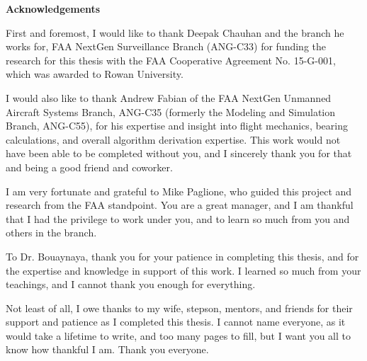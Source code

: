 
\begin{center}
\textbf{Acknowledgements}
\end{center}

First and foremost, I would like to thank Deepak Chauhan and the branch he works for, FAA NextGen Surveillance Branch (ANG-C33) for funding the research for this thesis with the FAA Cooperative Agreement No. 15-G-001, which was awarded to Rowan University.

I would also like to thank Andrew Fabian of the FAA NextGen Unmanned Aircraft Systems Branch, ANG-C35 (formerly the Modeling and Simulation Branch, ANG-C55), for his expertise and insight into flight mechanics, bearing calculations, and overall algorithm derivation expertise. This work would not have been able to be completed without you, and I sincerely thank you for that and being a good friend and coworker.

I am very fortunate and grateful to Mike Paglione, who guided this project and research from the FAA standpoint. You are a great manager, and I am thankful that I had the privilege to work under you, and to learn so much from you and others in the branch.

To Dr. Bouaynaya, thank you for your patience in completing this thesis, and for the expertise and knowledge in support of this work. I learned so much from your teachings, and I cannot thank you enough for everything. 

Not least of all, I owe thanks to my wife, stepson, mentors, and friends for their support and patience as I completed this thesis. I cannot name everyone, as it would take a lifetime to write, and too many pages to fill, but I want you all to know how thankful I am. Thank you everyone.


\newpage
